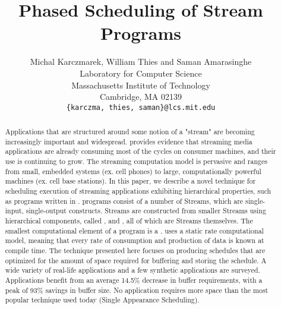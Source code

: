 \documentclass[runningheads,roman]{article}
\title{Phased Scheduling of Stream Programs}
\author{Michal Karczmarek, William Thies and Saman
Amarasinghe \\
Laboratory for Computer Science \\
        Massachusetts Institute of Technology \\
        Cambridge, MA  02139 \\
\texttt{\{karczma, thies, saman\}@lcs.mit.edu} \vspace{-24pt}}
\date{}
\begin{document}
\maketitle



\vspace{0.1in}

\begin{abstract}
Applications that are structured around some notion of a "stream"
are becoming increasingly important and widespread. \cite{Rix98}
provides evidence that streaming media applications are already
consuming most of the cycles on consumer machines, and their use
is continuing to grow. The streaming computation model is
pervasive and ranges from small, embedded systems (ex. cell
phones) to large, computationally powerful machines (ex. cell base
stations).
%
In this paper, we describe a novel technique for scheduling
execution of streaming applications exhibiting hierarchical
properties, such as programs written in {\StreamIt}. {\StreamIt}
programs consist of a number of Streams, which are single-input,
single-output constructs. Streams are constructed from smaller
Streams using hierarchical components, called {\pipeline},
{\splitjoin} and {\feedbackloop}, all of which are Streams themselves.
The smallest computational element of a {\StreamIt} program is a
{\filter}. {\StreamIt} uses a static rate computational model, meaning
that every {\filters} rate of consumption and production of data is
known at compile time.
%
The technique presented here focuses on producing schedules that
are optimized for the amount of space required for buffering and
storing the schedule. A wide variety of real-life applications and
a few synthetic applications are surveyed. Applications benefit
from an average 14.5\% decrease in buffer requirements, with a
peak of 93\% savings in buffer size. No application requires more
space than the most popular technique used today (Single
Appearance Scheduling).
\end{abstract}

%
%

%




%



%




\appendix


%
\end{document}
